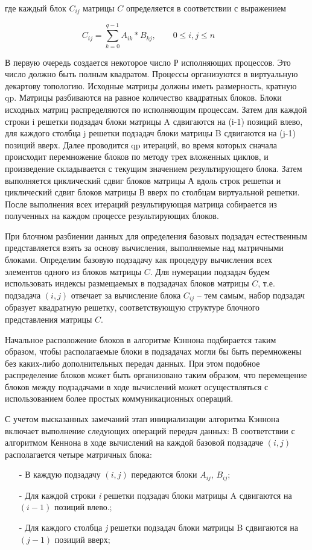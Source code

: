 \documentclass{report}
\begin{document}
где каждый блок $C_{ij}$ матрицы {\itshape $C$} определяется в соответствии с выражением
\par$$
    C_{ij} = \sum_{k=0}^{q-1} A_{ik} * B_{kj},\qquad 0 \le i,j \le n \qquad
    $$
\par В первую очередь создается некоторое число Р исполняющих процессов. Это число должно быть полным квадратом. Процессы организуются в виртуальную декартову топологию. Исходные матрицы должны иметь размерность, кратную qp. Матрицы разбиваются на равное количество квадратных блоков. Блоки исходных матриц распределяются по исполняющим процессам. Затем для каждой строки i решетки подзадач блоки матрицы A сдвигаются на (i-1) позиций влево, для каждого столбца j решетки подзадач блоки матрицы B сдвигаются на (j-1) позиций вверх. Далее проводится qp итераций, во время которых сначала происходит перемножение блоков по методу трех вложенных циклов, и произведение складывается с текущим значением результирующего блока. Затем выполняется циклический сдвиг блоков матрицы А вдоль строк решетки и циклический сдвиг блоков матрицы В вверх по столбцам виртуальной решетки. После выполнения всех итераций результирующая матрица собирается из полученных на каждом процессе результирующих блоков.
\par При блочном разбиении данных для определения базовых подзадач естественным представляется взять за основу вычисления, выполняемые над матричными блоками. Определим базовую подзадачу как процедуру вычисления всех элементов одного из блоков матрицы {\itshape $C$}. Для нумерации подзадач будем использовать индексы размещаемых в подзадачах блоков матрицы {\itshape $C$}, т.е. подзадача {\itshape $(i,j)$} отвечает за вычисление блока {\itshape $C_{ij}$} – тем самым, набор подзадач образует квадратную решетку, соответствующую структуре блочного представления матрицы {\itshape $C$}.

\par Начальное расположение блоков в алгоритме Кэннона подбирается таким образом, чтобы располагаемые блоки в подзадачах могли бы быть перемножены без каких-либо дополнительных передач данных. При этом подобное распределение блоков может быть организовано таким образом, что перемещение блоков между подзадачами в ходе вычислений может осуществляться с использованием более простых коммуникационных операций.
\par   С учетом высказанных замечаний этап инициализации алгоритма Кэннона включает выполнение следующих операций передач данных:
В соответствии с алгоритмом Кеннона в ходе вычислений на каждой базовой подзадаче {\itshape $(i,j)$} располагается четыре матричных блока:
\begin{itemize}
    \item[-] В каждую подзадачу {\itshape $(i,j)$} передаются блоки {\itshape $A_{ij}$}, {\itshape $B_{ij}$};
    \item[-] Для каждой строки {\itshape i} решетки подзадач блоки матрицы A сдвигаются на {\itshape $(i-1)$} позиций влево.;
    \item[-] Для каждого столбца {\itshape j} решетки подзадач блоки матрицы B сдвигаются на {\itshape $(j-1)$} позиций вверх;
\end{itemize} 
\newpage
\end{document}

